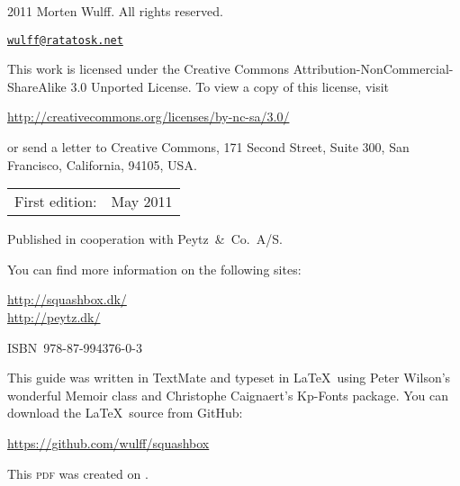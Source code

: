 \begingroup
\footnotesize
\setlength{\parindent}{0pt}
\setlength{\parskip}{\baselineskip}

\textcopyright{} 2011 Morten Wulff. All rights reserved.

\href{mailto:wulff@ratatosk.net}{\texttt{wulff@ratatosk.net}}

\vspace{2\baselineskip}

This work is licensed under the Creative Commons Attribution-NonCom\-mercial-ShareAlike 3.0 Unported License. To view a copy of this license, visit

\url{http://creativecommons.org/licenses/by-nc-sa/3.0/}

or send a letter to Creative Commons, 171 Second Street, Suite 300, San Francisco, California, 94105, USA.

\begin{center}
\begin{tabular}{ll}
First edition: & May 2011 \\
\end{tabular}
\end{center}

Published in cooperation with Peytz~\&~Co.\ A/S.

You can find more information on the following sites:

\url{http://squashbox.dk/} \\
\url{http://peytz.dk/}

\vspace{2\baselineskip}

ISBN~978-87-994376-0-3

\vspace{2\baselineskip}

This guide was written in TextMate and typeset in \LaTeX~using Peter Wilson's wonderful Memoir class and Christophe Caignaert's Kp-Fonts package. You can download the \LaTeX~source from GitHub:

\url{https://github.com/wulff/squashbox}

\vspace{2\baselineskip}

This \textsc{pdf} was created on \thedate.

\endgroup

\thispagestyle{empty}

\clearpage
